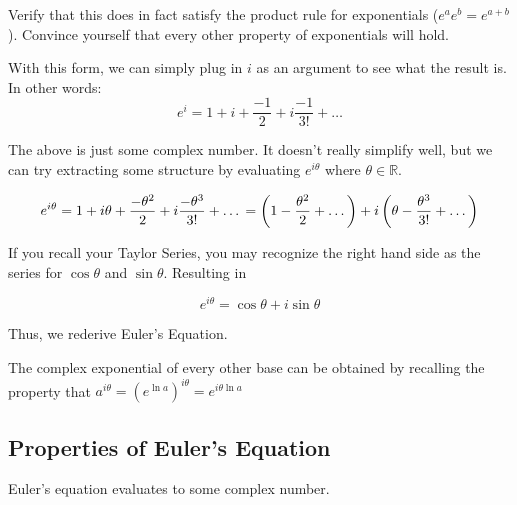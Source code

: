 \documentclass[
  letterpaper,
  DIV=11,
  numbers=noendperiod]{scrartcl}
\begin{document}
\begin{tcolorbox}[enhanced jigsaw, breakable, coltitle=black, colframe=quarto-callout-note-color-frame, opacityback=0, left=2mm, leftrule=.75mm, titlerule=0mm, bottomtitle=1mm, colbacktitle=quarto-callout-note-color!10!white, toprule=.15mm, arc=.35mm, rightrule=.15mm, title=\textcolor{quarto-callout-note-color}{\faInfo}\hspace{0.5em}{Exercise}, colback=white, opacitybacktitle=0.6, toptitle=1mm, bottomrule=.15mm]

Verify that this does in fact satisfy the product rule for exponentials
(\(e^ae^b = e^{a+b}\)). Convince yourself that every other property of
exponentials will hold.

\end{tcolorbox}

With this form, we can simply plug in \(i\) as an argument to see what
the result is. In other words:
\[e^i = 1 +i +\frac{-1}{2} + i\frac{-1}{3!} +\dots\]

The above is just some complex number. It doesn't really simplify well,
but we can try extracting some structure by evaluating \(e^{i\theta}\)
where \(\theta \in \mathbb R\).

\[e^{i\theta} = 1 + i\theta + \frac{-\theta^2}{2} + i\frac{-\theta^3}{3!} + \dots \\
= \left(1 - \frac{\theta^2}{2} + \dots \right) + i\left(\theta - \frac{\theta^3}{3!} + \dots \right)\]

If you recall your Taylor Series, you may recognize the right hand side
as the series for \(\cos{\theta}\) and \(\sin{\theta}\). Resulting in

\[e^{i\theta} = \cos{\theta} + i\sin{\theta}\]

Thus, we rederive Euler's Equation.

The complex exponential of every other base can be obtained by recalling
the property that
\(a^{i\theta} = (e^{\ln a})^{i\theta} = e^{i\theta\ln a}\)

\subsection{Properties of Euler's
Equation}\label{properties-of-eulers-equation}

Euler's equation evaluates to some complex number.
\end{document}
